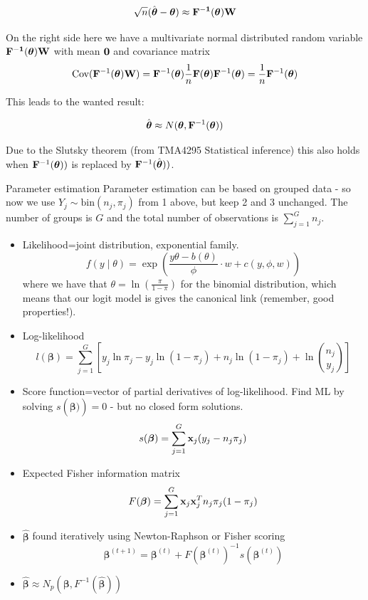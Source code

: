 \documentclass[
  ignorenonframetext,
]{beamer}
\begin{document}
\begin{frame}
\[
\sqrt{n}(\hat{\boldsymbol{\theta}}-{\boldsymbol{\theta}}) \approx \bf{F}^{-1}(\boldsymbol{\theta}){\bf W}
\]

On the right side here we have a multivariate normal distributed random
variable \(\bf{F}^{-1}(\boldsymbol{\theta}){\bf W}\) with mean
\({\bf 0}\) and covariance matrix
\[\text{Cov}({\bf F}^{-1}(\boldsymbol{\theta}){\bf W})={\bf F}^{-1}(\boldsymbol{\theta})\frac{1}{n}{\bf F}(\boldsymbol{\theta}){\bf F}^{-1}(\boldsymbol{\theta})=\frac{1}{n}{\bf F}^{-1}(\boldsymbol{\theta})\]

This leads to the wanted result:

\[ \hat{\boldsymbol{\theta}}\approx N(\boldsymbol{\theta},{\bf F}^{-1}(\boldsymbol{\theta}))\]

Due to the Slutsky theorem (from TMA4295 Statistical inference) this
also holds when \({\bf F}^{-1}(\boldsymbol{\theta}))\) is replaced by
\({\bf F}^{-1}(\hat{\boldsymbol{\theta}}))\).
\end{frame}

\begin{frame}{Parameter estimation}
\label{parameter-estimation}
Parameter estimation can be based on grouped data - so now we use
\(Y_j \sim \text{bin}(n_j,\pi_j)\) from 1 above, but keep 2 and 3
unchanged. The number of groups is \(G\) and the total number of
observations is \(\sum_{j=1}^G
n_j\).

\begin{itemize}
\item
  Likelihood=joint distribution, exponential family.
  \[ f(y\mid \theta)=\exp \left( \frac{y \theta-b(\theta)}{\phi}\cdot w + c(y, \phi, w) \right) \]
  where we have that \(\theta=\ln(\frac{\pi}{1-\pi})\) for the binomial
  distribution, which means that our logit model is gives the canonical
  link (remember, good properties!).
\item
  Log-likelihood
  \[l(\boldsymbol{\beta})=\sum_{j=1}^G[y_j \ln \pi_j-y_j\ln(1-\pi_j)+n_j\ln(1-\pi_j)+ \ln {n_j \choose y_j}]\]
\end{itemize}
\end{frame}

\begin{frame}
\begin{itemize}
\item
  Score function=vector of partial derivatives of log-likelihood. Find
  ML by solving \(s(\hat{\boldsymbol{\beta})})=0\) - but no closed form
  solutions.
  \[s(\boldsymbol{\beta})=\sum_{j=1}^G {\bf x}_j (y_j-n_j\pi_j)\]
\item
  Expected Fisher information matrix
  \[F(\boldsymbol{\beta})=\sum_{j=1}^G {\bf x}_j {\bf x}_j^T n_j \pi_j (1-\pi_j)\]
\item
  \(\hat{\boldsymbol{\beta}}\) found iteratively using Newton-Raphson or
  Fisher scoring
  \[\boldsymbol{\beta}^{(t+1)}=\boldsymbol{\beta}^{(t)} + F(\boldsymbol{\beta}^{(t)})^{-1} s(\boldsymbol{\beta}^{(t)})\]
\item
  \(\hat{\boldsymbol{\beta}} \approx N_p(\boldsymbol{\beta},F^{-1}(\hat{\boldsymbol{\beta}}))\)
\end{itemize}
\end{frame}
\end{document}
